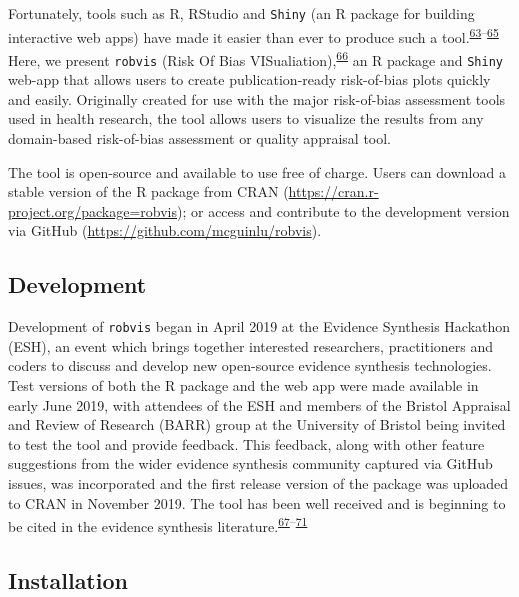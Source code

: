 \documentclass[a4paper, twoside]{templates/ociamthesis}
\begin{document}
Fortunately, tools such as R, RStudio and \texttt{Shiny} (an R package for building interactive web apps) have made it easier than ever to produce such a tool.\textsuperscript{\protect\hyperlink{ref-rref}{63}--\protect\hyperlink{ref-shinyref}{65}} Here, we present \texttt{robvis} (Risk Of Bias VISualiation),\textsuperscript{\protect\hyperlink{ref-mcguinness2019a}{66}} an R package and \texttt{Shiny} web-app that allows users to create publication-ready risk-of-bias plots quickly and easily. Originally created for use with the major risk-of-bias assessment tools used in health research, the tool allows users to visualize the results from any domain-based risk-of-bias assessment or quality appraisal tool.

The tool is open-source and available to use free of charge. Users can download a stable version of the R package from CRAN (\url{https://cran.r-project.org/package=robvis}); or access and contribute to the development version via GitHub (\url{https://github.com/mcguinlu/robvis}).

\hypertarget{development-1}{%
\subsection{Development}\label{development-1}}

Development of \texttt{robvis} began in April 2019 at the Evidence Synthesis Hackathon (ESH), an event which brings together interested researchers, practitioners and coders to discuss and develop new open-source evidence synthesis technologies. Test versions of both the R package and the web app were made available in early June 2019, with attendees of the ESH and members of the Bristol Appraisal and Review of Research (BARR) group at the University of Bristol being invited to test the tool and provide feedback. This feedback, along with other feature suggestions from the wider evidence synthesis community captured via GitHub issues, was incorporated and the first release version of the package was uploaded to CRAN in November 2019. The tool has been well received and is beginning to be cited in the evidence synthesis literature.\textsuperscript{\protect\hyperlink{ref-gibb2019consistent}{67}--\protect\hyperlink{ref-tanneru2020}{71}}

\hypertarget{installation-1}{%
\subsection{Installation}\label{installation-1}}
\end{document}
